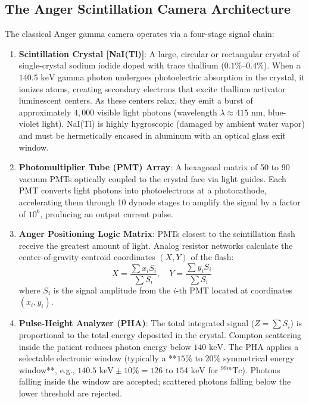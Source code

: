 \documentclass[11pt,a4paper]{article}
\begin{document}
\subsection{The Anger Scintillation Camera Architecture}
The classical Anger gamma camera operates via a four-stage signal chain:
\begin{enumerate}[leftmargin=*]
    \item \textbf{Scintillation Crystal [NaI(Tl)]}: A large, circular or rectangular crystal of single-crystal sodium iodide doped with trace thallium ($0.1\%\text{--}0.4\%$). When a $140.5\text{ keV}$ gamma photon undergoes photoelectric absorption in the crystal, it ionizes atoms, creating secondary electrons that excite thallium activator luminescent centers. As these centers relax, they emit a burst of approximately $4,000\text{ visible light photons}$ (wavelength $\lambda \approx 415\text{ nm}$, blue-violet light). NaI(Tl) is highly hygroscopic (damaged by ambient water vapor) and must be hermetically encased in aluminum with an optical glass exit window.
    \item \textbf{Photomultiplier Tube (PMT) Array}: A hexagonal matrix of 50 to 90 vacuum PMTs optically coupled to the crystal face via light guides. Each PMT converts light photons into photoelectrons at a photocathode, accelerating them through 10 dynode stages to amplify the signal by a factor of $10^6$, producing an output current pulse.
    \item \textbf{Anger Positioning Logic Matrix}: PMTs closest to the scintillation flash receive the greatest amount of light. Analog resistor networks calculate the center-of-gravity centroid coordinates $(X, Y)$ of the flash:
    \begin{equation}
        X = \frac{\sum x_i S_i}{\sum S_i}, \quad Y = \frac{\sum y_i S_i}{\sum S_i}
    \end{equation}
    where $S_i$ is the signal amplitude from the $i$-th PMT located at coordinates $(x_i, y_i)$.
    \item \textbf{Pulse-Height Analyzer (PHA)}: The total integrated signal ($Z = \sum S_i$) is proportional to the total energy deposited in the crystal. Compton scattering inside the patient reduces photon energy below $140\text{ keV}$. The PHA applies a selectable electronic window (typically a **$15\%\text{ to }20\%$ symmetrical energy window**, e.g., $140.5\text{ keV} \pm 10\% = 126\text{ to }154\text{ keV}$ for $^{99m}\text{Tc}$). Photons falling inside the window are accepted; scattered photons falling below the lower threshold are rejected.
\end{enumerate}
\end{document}
